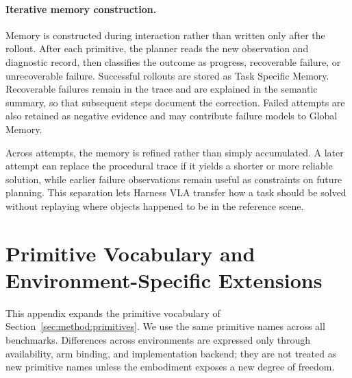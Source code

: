 \documentclass[11pt]{article}
\begin{document}
  \paragraph{Iterative memory construction.}
  Memory is constructed during interaction rather than written only after the rollout.
  After each primitive, the planner reads the new observation and diagnostic record, then
  classifies the outcome as progress, recoverable failure, or unrecoverable failure.
  Successful rollouts are stored as Task Specific Memory. Recoverable failures remain in
  the trace and are explained in the semantic summary, so that subsequent steps document
  the correction. Failed attempts are also retained as negative evidence and may
  contribute failure models to Global Memory.

  Across attempts, the memory is refined rather than simply accumulated. A later attempt
  can replace the procedural trace if it yields a shorter or more reliable solution,
  while earlier failure observations remain useful as constraints on future planning.
  This separation lets Harness VLA transfer how a task should be solved without replaying
  where objects happened to be in the reference scene.
\section{Primitive Vocabulary and Environment-Specific Extensions}
\label{app:primitives}

This appendix expands the primitive vocabulary of Section~\ref{sec:method:primitives}. We use the same primitive names across all benchmarks. Differences across environments are expressed only through availability, arm binding, and implementation backend; they are not treated as new primitive names unless the embodiment exposes a new degree of freedom.
\end{document}
